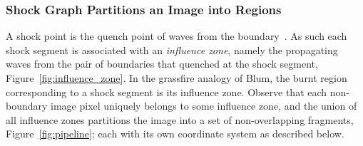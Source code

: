 \subsubsection{Shock Graph Partitions an Image into Regions}
\label{sec:sg_to_regions}





A shock point is the quench point of waves from the boundary~\cite{Blum67Transformation}. As such each shock segment is associated with an \emph{influence zone}, namely the propagating waves from the pair of boundaries that quenched at the shock segment, Figure~\ref{fig:influence_zone}. In the grassfire analogy of Blum, the burnt region corresponding to a shock segment is its influence zone. Observe that each non-boundary image pixel uniquely belongs to some influence zone, and the union of all influence zones partitions the image into a set of non-overlapping fragments, Figure~\ref{fig:pipeline}; each with its own coordinate system as described below. 


